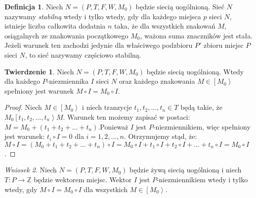 \documentclass[a4paper,12pt]{book}
\theoremstyle{definition}
\newtheorem{df}{Definicja}
\newtheorem{tw}{Twierdzenie}
\theoremstyle{remark}
\newtheorem{lm}[tw]{Wniosek}
\begin{document}
     
\begin{df}
Niech $N=(P,T,F,W,M_0)$ będzie siecią uogólnioną. Sieć $N$ nazywamy \textit{stabilną} wtedy i tylko wtedy, gdy dla każdego miejsca $p$ sieci $N$, istnieje liczba całkowita dodatnia $n$ taka, że dla wszystkich znakowań $M$, osiągalnych ze znakowania początkowego $M_0$, ważona suma znaczników jest stała. Jeżeli warunek ten zachodzi jedynie dla właściwego podzbioru $P'$ zbioru miejsc $P$ sieci $N$, to sieć nazywamy częściowo stabilną.
\end{df}
\begin{tw}
Niech $N=(P,T,F,W,M_0)$ będzie siecią uogólnioną. Wtedy dla każdego $P$-niezmiennika $I$ sieci $N$ oraz każdego znakowania $M \in \left[M_0\right>$ spełniony jest warunek $M \circ I = M_0 \circ I$.  
\end{tw}
\begin{proof}
Niech $M \in \left[M_0\right>$ i niech tranzycje $t_1,t_2,\dots,t_n \in T$ będą takie, że $M_0 \left[t_1,t_2,\dots,t_n\right> M$. Warunek ten możemy zapisać w postaci: $M = M_0 + (t_1+t_2+\dots+t_n)$.Ponieważ $I$ jest $P$-niezmiennikiem, więc spełniony jest warunek: $t_i \circ I = 0$ dla $i = 1,2,\dots,n$. Otrzymujemy stąd, że: $M \circ I = (M_0 + t_1+t_2+\dots+t_n) \circ I = M_0 \circ I + t_1 \circ I + t_2 \circ I + \dots + t_n \circ I = M_0 \circ I$.
\end{proof}
\begin{lm}
	Niech $N=(P,T,F,W,M_0)$ będzie żywą siecią uogólnioną i niech $T \colon P \to \mathbb{Z}$ będzie wektorem miejsc. Wektor $I$ jest $P$-niezmiennikiem wtedy i tylko wtedy, gdy $M \circ I = M_0 \circ I$ dla wszystkich $M \in \left[M_0\right>$.
\end{lm}
\end{document}
